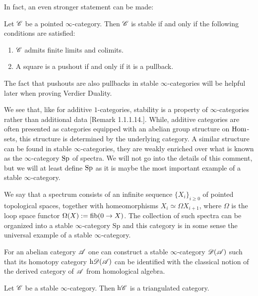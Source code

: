 \documentclass[../../thesis.tex]{subfiles}
\begin{document}
In fact, an even stronger statement can be made:
\begin{proposition}
    Let $\mathscr{C}$ be a pointed $\infty$-category.
    Then $\mathscr{C}$ is stable if and only if the following conditions are satisfied:
    \begin{enumerate}
        \item $\mathscr{C}$ admits finite limits and colimits.
        \item A square is a pushout if and only if it is a pullback.
    \end{enumerate}
\end{proposition}
The fact that pushouts are also pullbacks in stable $\infty$-categories will be helpful later when proving Verdier Duality.


We see that, like for additive $1$-categories, stability is a property of $\infty$-categories rather than additional data \cite{HA}[Remark 1.1.1.14.].
While, additive categories are often presented as categories equipped with an abelian group structure on $\mathrm{Hom}$-sets, this structure is determined by the underlying category.
A similar structure can be found in stable $\infty$-categories, they are weakly enriched over what is known as the $\infty$-category $\mathrm{Sp}$ of spectra.
We will not go into the details of this comment, but we will at least define $\mathrm{Sp}$ as it is maybe the most important example of a stable $\infty$-category.
\begin{example}[{\cite{HA}[Example 1.1.1.11.]}]
    We say that a spectrum consists of an infinite sequence $\{X_i\}_{i \geq 0}$ of pointed topological spaces, together with homeomorphisms $X_i \simeq \Omega X_{i+1}$, where $\Omega$ is the loop space functor $\Omega(X) : = \operatorname{fib}(0 \to X)$.
    The collection of such spectra can be organized into a stable $\infty$-category $\mathrm{Sp}$ and this category is in some sense the universal example of a stable $\infty$-category.
\end{example}
\begin{example}[{\cite{HA}[Example 1.1.1.12.]}]
    For an abelian category $\mathscr{A}$ one can construct a stable $\infty$-category $\mathscr{D}(\mathscr{A})$ such that its homotopy category $\mathrm{h}\mathscr{D}(\mathscr{A})$ can be identified with the classical notion of the derived category of $\mathscr{A}$ from homological algebra.
\end{example}
\begin{theorem}[{\cite{HA}[Theorem 1.1.2.14.]}]
    Let $\mathscr{C}$ be a stable $\infty$-category.
    Then $\mathrm{h}\mathscr{C}$ is a triangulated category.
\end{theorem}
\end{document}
